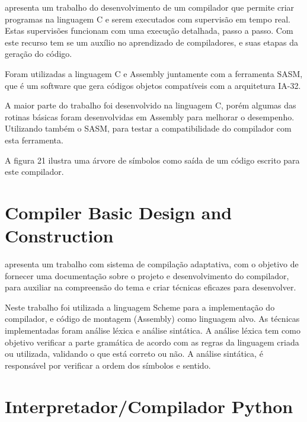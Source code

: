 \documentclass[12pt,oneside,a4paper,chapter=TITLE,section=TITLE,sumario=tradicional]{abntex2}
\begin{document}
\cite{juliano2009} apresenta um trabalho do desenvolvimento de um compilador que permite criar programas na linguagem C e serem executados com supervisão em tempo real. Estas supervisões funcionam com uma execução detalhada, passo a passo. Com este recurso tem se um auxílio no aprendizado de compiladores, e suas etapas da geração do código.

Foram utilizadas a linguagem C e Assembly juntamente com a ferramenta SASM, que é um software que gera códigos objetos compatíveis com a arquitetura IA-32.

A maior parte do trabalho foi desenvolvido na linguagem C, porém algumas das rotinas básicas foram desenvolvidas em Assembly para melhorar o desempenho. Utilizando também o SASM, para testar a compatibilidade do compilador com esta ferramenta.

A figura 21 ilustra uma árvore de símbolos como saída de um código escrito para este compilador. 

\begin{figure}[htb]
\end{figure}

\section{Compiler Basic Design and Construction}
\label{sec:compiler-basic}

\cite{mahak2009} apresenta um trabalho com sistema de compilação adaptativa, com o objetivo de fornecer uma documentação sobre o projeto e desenvolvimento do compilador, para auxiliar na compreensão do tema e criar técnicas eficazes para desenvolver.

Neste trabalho foi utilizada a linguagem Scheme para a implementação do compilador, e código de montagem (Assembly) como linguagem alvo. As técnicas implementadas foram análise léxica e análise sintática. A análise léxica tem como objetivo verificar a parte gramática de acordo com as regras da linguagem criada ou utilizada, validando o que está correto ou não. A análise sintática, é responsável por verificar a ordem dos símbolos e sentido.

\section{ Interpretador/Compilador Python}
\label{sec:interpretador-compilador}
\end{document}
